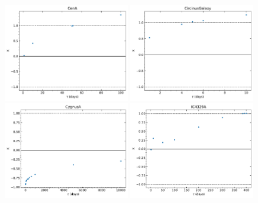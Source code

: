 \begin{figure}
\begin{center}
    {
  \includegraphics[width=0.49\textwidth]{Figs/Chapter5/X_tau/X_tau_CenA.pdf} \hfill 
  \includegraphics[width=0.49\textwidth]{Figs/Chapter5/X_tau/X_tau_CircinusGalaxy.pdf} \hfill \\
  \includegraphics[width=0.49\textwidth]{Figs/Chapter5/X_tau/X_tau_CygnusA.pdf} \hfill 
  \includegraphics[width=0.49\textwidth]{Figs/Chapter5/X_tau/X_tau_IC4329A.pdf} \hfill \\
}
\end{center}
\end{figure}

